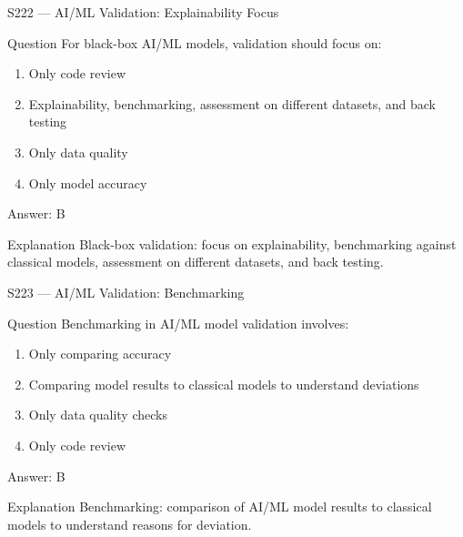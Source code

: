 \documentclass[aspectratio=169,8pt]{beamer}
\begin{document}
\begin{frame}{S222 --- AI/ML Validation: Explainability Focus}
	\begin{block}{Question}
		For black-box AI/ML models, validation should focus on:
		\begin{enumerate}
			\item Only code review
			\item Explainability, benchmarking, assessment on different datasets, and back testing
			\item Only data quality
			\item Only model accuracy
		\end{enumerate}
	\end{block}
	\begin{exampleblock}{Answer: B}\end{exampleblock}
	\begin{block}{Explanation}
		Black-box validation: focus on explainability, benchmarking against classical models, assessment on different datasets, and back testing.
	\end{block}
\end{frame}

\begin{frame}{S223 --- AI/ML Validation: Benchmarking}
	\begin{block}{Question}
		Benchmarking in AI/ML model validation involves:
		\begin{enumerate}
			\item Only comparing accuracy
			\item Comparing model results to classical models to understand deviations
			\item Only data quality checks
			\item Only code review
		\end{enumerate}
	\end{block}
	\begin{exampleblock}{Answer: B}\end{exampleblock}
	\begin{block}{Explanation}
		Benchmarking: comparison of AI/ML model results to classical models to understand reasons for deviation.
	\end{block}
\end{frame}
\end{document}
